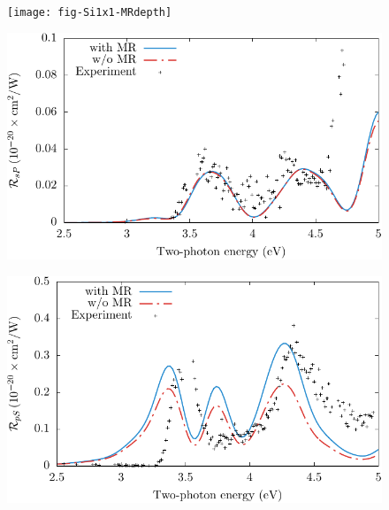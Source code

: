 \documentclass{beamer}
\begin{document}
\begin{frame}
\begin{figure}
\centering
\texttt{[image: fig-Si1x1-MRdepth]}
\end{figure}
\end{frame}

\begin{frame}
\begin{figure}
\centering
\includegraphics[width=\textwidth]{fig-Si1x1-Mejia_RsP}
\end{figure}
\end{frame}

\begin{frame}
\begin{figure}
\centering
\includegraphics[width=\textwidth]{fig-Si1x1-Mejia_RpS}
\end{figure}
\end{frame}


\end{document}
